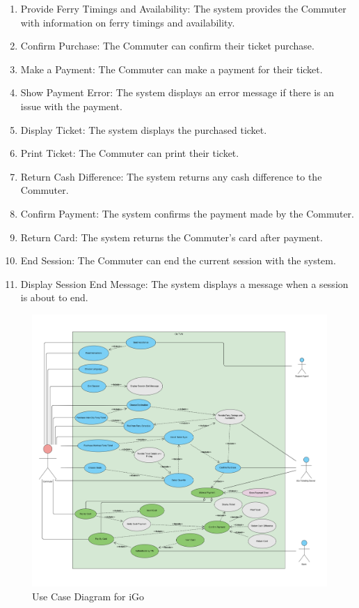 \documentclass[letterpaper]{report}
\begin{document}
\begin{enumerate}[label=UC-\arabic*]
    \item Provide Ferry Timings and Availability: The system provides the Commuter with information on ferry timings and availability.
    \item Confirm Purchase: The Commuter can confirm their ticket purchase.
    \item Make a Payment: The Commuter can make a payment for their ticket.
    \item Show Payment Error: The system displays an error message if there is an issue with the payment.
    \item Display Ticket: The system displays the purchased ticket.
    \item Print Ticket: The Commuter can print their ticket.
    \item Return Cash Difference: The system returns any cash difference to the Commuter.
    \item Confirm Payment: The system confirms the payment made by the Commuter.
    \item Return Card: The system returns the Commuter's card after payment.
     \item End Session: The Commuter can end the current session with the system.
    \item Display Session End Message: The system displays a message when a session is about to end.
\end{enumerate}

\begin{figure}[ht]
    \centering
    \includegraphics[width=\textwidth, height=\textheight, keepaspectratio]{UseCaseDiagrams/iGousecase.png}
    \caption{Use Case Diagram for iGo}
    \label{fig:UseCaseDiagram}
\end{figure}
\end{document}
